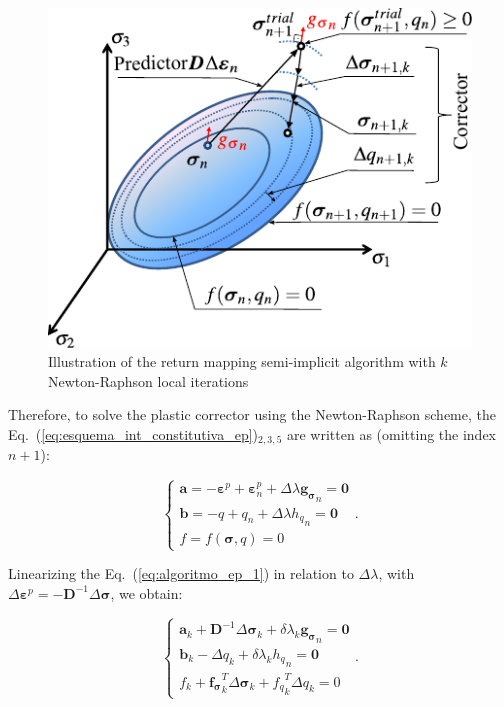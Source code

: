 \documentclass[Journal,letterpaper]{ascelike-new}
\newcommand{\al}{\boldsymbol a}
\newcommand{\bl}{\boldsymbol b}
\newcommand{\dfds}{\boldsymbol{f_\sigma}}
\newcommand{\dfdq}{{f_q}}
\newcommand{\dgds}{\boldsymbol{g_\sigma}}
\newcommand{\Dsdee}{\boldsymbol{D}}
\newcommand{\hl}{{h_q}}
\newcommand{\strainp}{\boldsymbol{\varepsilon}^{p}}
\newcommand{\stress}{\boldsymbol{\sigma}}
\newcommand{\zerol}{\boldsymbol 0}
\begin{document}
\begin{figure}
	\centering
	\includegraphics[scale=1]{FIG3.pdf}
	\caption{Illustration of the return mapping semi-implicit algorithm with $k$ Newton-Raphson local iterations}
	\label{ep-algorithm-representation}
\end{figure}

Therefore, to solve the plastic corrector using the Newton-Raphson scheme, the Eq.~(\ref{eq:esquema_int_constitutiva_ep})$_{2,3,5}$ are written as (omitting the index $n+1$):

\begin{equation}
	\label{eq:algoritmo_ep_1}
	\left\{
	\begin{array}{lcl}
		\al = -\strainp + \strainp_n + \Delta \lambda \dgds_n = \zerol	\\
		\bl = -q + q_n + \Delta\lambda\hl_n = \zerol \\
		f = f(\stress,q) = 0
	\end{array}
	\right..
\end{equation}

Linearizing the Eq.~(\ref{eq:algoritmo_ep_1}) in relation to $\Delta \lambda$, with $\Delta \strainp = - \Dsdee^{-1}\Delta\stress$, we obtain:

\begin{equation}
	\label{eq:algoritmo_ep_2}
	\left\{
	\begin{array}{lcl}
		\al_k + \Dsdee^{-1}\Delta\stress_k + \delta \lambda_k \dgds_n = \zerol \\
		\bl_k - \Delta q_k + \delta \lambda_k \hl_n = \zerol \\
		f_k + \dfds_k^T\Delta\stress_k + \dfdq_k^T \Delta q_k = 0
	\end{array}
	\right..
\end{equation}
\end{document}
